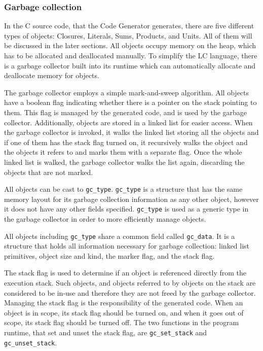 \documentclass[12pt]{article}
\begin{document}
\subsubsection{Garbage collection}

In the C source code, that the Code Generator generates, there are five
different types of objects: Closures, Literals, Sums, Products, and Units. All
of them will be discussed in the later sections. All objects occupy memory on
the heap, which has to be allocated and deallocated manually. To simplify the LC
language, there is a garbage collector built into its runtime which can
automatically allocate and deallocate memory for objects. 

The garbage collector employs a simple mark-and-sweep algorithm. All objects
have a boolean flag indicating whether there is a pointer on the stack pointing
to them. This flag is managed by the generated code, and is used by the garbage
collector. Additionally, objects are stored in a linked list for easier access.
When the garbage collector is invoked, it walks the linked list storing all the
objects and if one of them has the stack flag turned on, it recursively walks
the object and the objects it refers to and marks them with a separate flag.
Once the whole linked list is walked, the garbage collector walks the list
again, discarding the objects that are not marked.

All objects can be cast to \verb$gc_type$. \verb$gc_type$ is a structure that
has the same memory layout for its garbage collection information as any other
object, however it does not have any other fields specified. \verb$gc_type$ is
used as a generic type in the garbage collector in order to more efficiently
manage objects.

All objects including \verb$gc_type$ share a common field called
\verb$gc_data$. It is a structure that holds all information necessary for
garbage collection: linked list primitives, object size and kind, the marker
flag, and the stack flag.

The stack flag is used to determine if an object is referenced directly from the
execution stack. Such objects, and objects referred to by objects on the stack
are considered to be in-use and therefore they are not freed by the garbage
collector. Managing the stack flag is the responsibility of the generated code.
When an object is in scope, its stack flag should be turned on, and when it goes
out of scope, its stack flag should be turned off. The two functions in the
program runtime, that set and unset the stack flag, are \verb$gc_set_stack$ and
\verb$gc_unset_stack$.
\end{document}
